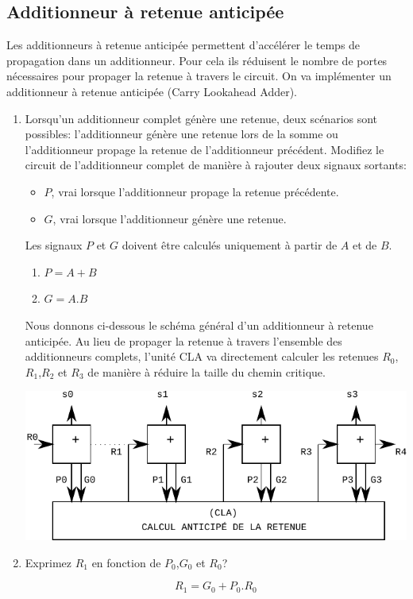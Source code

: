 \documentclass[a4paper,10pt]{exam}
\begin{document}
\subsection{Additionneur à retenue anticipée}
Les additionneurs à retenue anticipée permettent d'accélérer le temps de
propagation dans un additionneur. Pour cela ils réduisent le nombre de portes
nécessaires pour propager la retenue à travers le circuit.  On va implémenter un
additionneur à retenue anticipée (Carry Lookahead Adder).

\begin{enumerate}
\item Lorsqu'un additionneur complet génère une retenue, deux scénarios sont
  possibles: l'additionneur génère une retenue lors de la somme ou
  l'additionneur propage la retenue de l'additionneur précédent.  Modifiez le
  circuit de l'additionneur complet de manière à rajouter deux signaux sortants:
  \begin{itemize}
    \item $P$, vrai lorsque l'additionneur propage la retenue précédente.
    \item $G$, vrai lorsque l'additionneur génère une retenue.
  \end{itemize}
  Les signaux $P$ et $G$ doivent être calculés uniquement à partir de $A$ et de
  $B$.
\begin{solution}
  \begin{enumerate}
  \item $P = A + B$
  \item $G = A.B$
  \end{enumerate}
\end{solution}

Nous donnons ci-dessous le schéma général d'un additionneur
à retenue anticipée. Au lieu de propager la retenue à travers
l'ensemble des additionneurs complets, l'unité CLA va directement
calculer les retenues $R_0$,$R_1$,$R_2$ et $R_3$ de manière à réduire
la taille du chemin critique.

\includegraphics{TD10-CLA1}
\item Exprimez $R_1$ en fonction de $P_0$,$G_0$ et $R_0$?
\begin{solution}
  $$ R_1 = G_0 + P_0.R_0 $$
\end{solution}


\end{enumerate}
\end{document}
